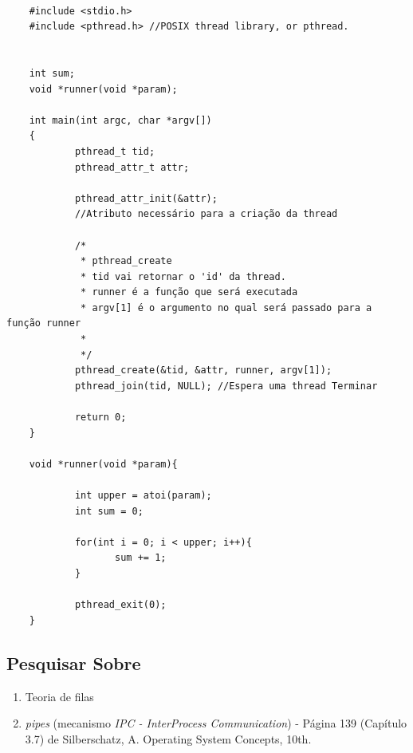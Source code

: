 \begin{verbatim}

    #include <stdio.h>
    #include <pthread.h> //POSIX thread library, or pthread.
    
    
    int sum;
    void *runner(void *param);
    
    int main(int argc, char *argv[])
    {
            pthread_t tid;
            pthread_attr_t attr;
            
            pthread_attr_init(&attr); 
            //Atributo necessário para a criação da thread
            
            /*
             * pthread_create
             * tid vai retornar o 'id' da thread. 
             * runner é a função que será executada
             * argv[1] é o argumento no qual será passado para a função runner
             *
             */
            pthread_create(&tid, &attr, runner, argv[1]); 
            pthread_join(tid, NULL); //Espera uma thread Terminar
            
            return 0;
    }
    
    void *runner(void *param){
            
            int upper = atoi(param);
            int sum = 0;
            
            for(int i = 0; i < upper; i++){
                   sum += 1;
            }
            
            pthread_exit(0);
    }
\end{verbatim}



\hypertarget{pesquisar-sobre-1}{%
\subsection{Pesquisar Sobre}\label{pesquisar-sobre-1}}

\begin{enumerate}
\def\labelenumi{\arabic{enumi}.}

\item
  Teoria de filas
\item
  \emph{pipes} (mecanismo \emph{IPC - InterProcess Communication}) -
  Página 139 (Capítulo 3.7) de Silberschatz, A. Operating System
  Concepts, 10th.
\end{enumerate}
